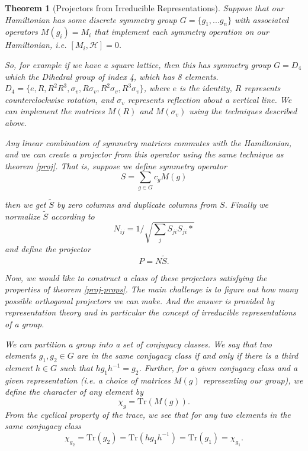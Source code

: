 \documentclass{article}
\newtheorem{theorem}{Theorem}[section]
\theoremstyle{definition}
\begin{document}
\begin{theorem}[Projectors from Irreducible Representations]
Suppose that our Hamiltonian has some discrete symmetry group $G = \{g_1, ... g_n\}$ with associated operators $M(g_i) = M_i$ that implement each symmetry operation on our Hamiltonian, i.e. $[M_i,\mathcal{H}] = 0$.

So, for example if we have a square lattice, then this has symmetry group $G = D_4$ which the Dihedral group of index 4, which has 8 elements. $D_4 = \{e, R, R^2 R^3, \sigma_v, R\sigma_v, R^2\sigma_v,R^3\sigma_v\}$, where $e$ is the identity, $R$ represents counterclockwise rotation, and $\sigma_v$ represents reflection about a vertical line. We can implement the matrices $M(R)$ and $M(\sigma_v)$ using the techniques described above.

Any linear combination of symmetry matrices commutes with the Hamiltonian, and we can create a projector from this operator using the same technique as theorem \ref{proj}. That is, suppose we define symmetry operator
\begin{equation}
S = \sum_{g \in G} c_g M(g)
\end{equation}

then we get $\tilde S$ by zero columns and duplicate columns from $S$. Finally we normalize $\tilde S$ according to
\begin{equation}
N_{ij} = 1/\sqrt{\sum_{j} S_{ji} S_{ji}*}
\end{equation}
and define the projector
\begin{equation}
P = N \tilde S.
\end{equation}

Now, we would like to construct a class of these projectors satisfying the properties of theorem \ref{proj-props}. The main challenge is to figure out how many possible orthogonal projectors we can make. And the answer is provided by representation theory and in particular the concept of irreducible representations of a group.

We can partition a group into a set of \emph{conjugacy classes}. We say that two elements $g_1,g_2 \in G$ are in the same conjugacy class if and only if there is a third element $h \in G$ such that $h g_1 h^{-1} = g_2$. Further, for a given conjugacy class and a given representation (i.e. a choice of matrices $M(g)$ representing our group), we define the \emph{character} of any element by
\begin{equation}
\chi_g = \text{Tr}(M(g)).
\end{equation}
From the cyclical property of the trace, we see that for any two elements in the same conjugacy class
\begin{equation}
\chi_{g_2} = \text{Tr}(g_2) = \text{Tr}(hg_1h^{-1}) =\text{Tr}(g_1) = \chi_{g_1}.
\end{equation}


\end{theorem}
\end{document}
